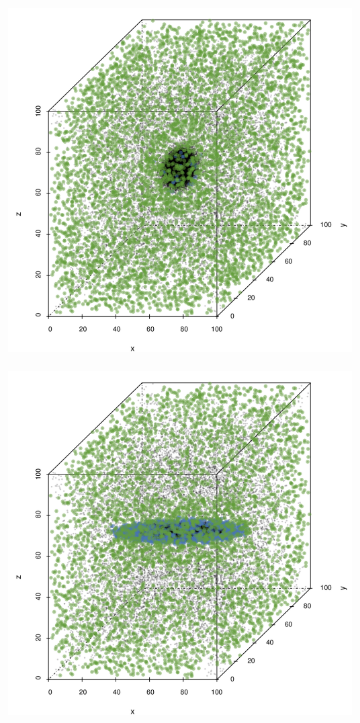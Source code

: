 \begin{figure}
\begin{subfigure}{0.23\textwidth}
					\includegraphics[keepaspectratio=true, width=\textwidth, height=0.23\textheight]{discussion/img/ferdosi_1_60000_anisotropy.png}
					\caption{}
					\label{fig:discussion:anisotropy:baakman1}
				\end{subfigure}	
				\begin{subfigure}{0.23\textwidth}
					\centering
					\includegraphics[keepaspectratio=true, width=\textwidth, height=0.23\textheight]{discussion/img/baakman_4_60000_anisotropy.png}

\end{subfigure}
\end{figure}
